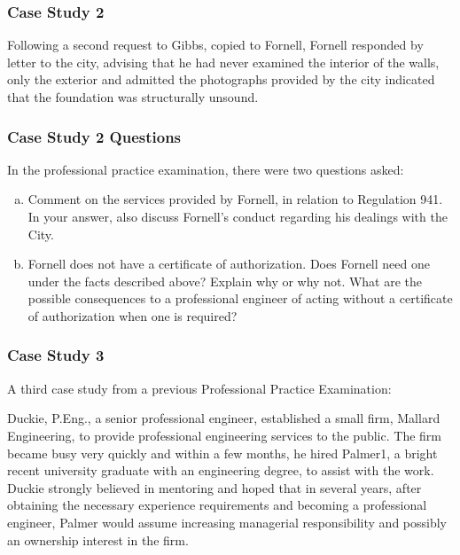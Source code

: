 \begin{frame}
\frametitle{Case Study 2}

Following a second request to Gibbs, copied to Fornell, Fornell responded by letter to the city, advising that he had never examined the interior of the walls, only the exterior and admitted the photographs provided by the city indicated that the foundation was structurally unsound.


\end{frame}



\begin{frame}
\frametitle{Case Study 2 Questions}

In the professional practice examination, there were two questions asked: 

\begin{enumerate}[(a)]
\item Comment on the services provided by Fornell, in relation to Regulation 941. In your answer, also discuss Fornell's conduct regarding his dealings with the City.
\item Fornell does not have a certificate of authorization.  Does Fornell need one under the facts described above?  Explain why or why not.  What are the possible consequences to a professional engineer of acting without a certificate of authorization when one is required?
\end{enumerate}

\end{frame}



\begin{frame}
\frametitle{Case Study 3}

A third case study from a previous Professional Practice Examination:

	Duckie, P.Eng., a senior professional engineer, established a small firm, Mallard Engineering, to provide professional engineering services to the public.  The firm became busy very quickly and within a few months, he hired Palmer1, a bright recent university graduate with an engineering degree, to assist with the work.  Duckie strongly believed in mentoring and hoped that in several years, after obtaining the necessary experience requirements and becoming a professional engineer, Palmer would assume increasing managerial responsibility and possibly an ownership interest in the firm.

\end{frame}



